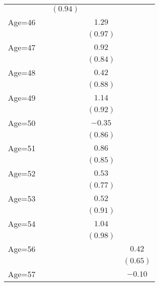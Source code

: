 \documentclass[fullpage]{paper}
\begin{document}
\begin{center}
\begin{longtable}{l c c c c }
            &               & $(0.94)$      &               &               \\
Age=46      &               &               & $1.29$        &               \\
            &               &               & $(0.97)$      &               \\
Age=47      &               &               & $0.92$        &               \\
            &               &               & $(0.84)$      &               \\
Age=48      &               &               & $0.42$        &               \\
            &               &               & $(0.88)$      &               \\
Age=49      &               &               & $1.14$        &               \\
            &               &               & $(0.92)$      &               \\
Age=50      &               &               & $-0.35$       &               \\
            &               &               & $(0.86)$      &               \\
Age=51      &               &               & $0.86$        &               \\
            &               &               & $(0.85)$      &               \\
Age=52      &               &               & $0.53$        &               \\
            &               &               & $(0.77)$      &               \\
Age=53      &               &               & $0.52$        &               \\
            &               &               & $(0.91)$      &               \\
Age=54      &               &               & $1.04$        &               \\
            &               &               & $(0.98)$      &               \\
Age=56      &               &               &               & $0.42$        \\
            &               &               &               & $(0.65)$      \\
Age=57      &               &               &               & $-0.10$       \\

\end{longtable}
\end{center}
\end{document}
